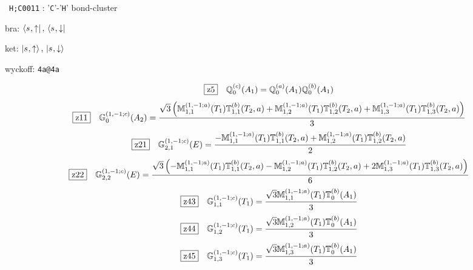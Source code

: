 \documentclass[fleqn,10pt,landscape]{jsarticle}
\begin{document}
\noindent\textbullet\, \texttt{H;C\texttt{}001\texttt{}1} : '\texttt{C}'-'\texttt{H}' bond-cluster

\noindent\quad * bra: $\bra{s_{},\uparrow},\, \bra{s_{},\downarrow}$

\noindent\quad * ket: $\ket{s_{},\uparrow},\, \ket{s_{},\downarrow}$

\noindent\quad * wyckoff: \texttt{4a@4a}

\begin{dmath*}
\hspace*{3mm}\fbox{z5}\quad \mathbb{Q}_{0}^{(c)}(A_{1})=\mathbb{Q}_{0}^{(a)}(A_{1}) \mathbb{Q}_{0}^{(b)}(A_{1})
\end{dmath*}
\begin{dmath*}
\hspace*{3mm}\fbox{z11}\quad \mathbb{G}_{0}^{(1,-1;c)}(A_{2})=\frac{\sqrt{3} \left(\mathbb{M}_{1,1}^{(1,-1;a)}(T_{1}) \mathbb{T}_{1,1}^{(b)}(T_{2},a) + \mathbb{M}_{1,2}^{(1,-1;a)}(T_{1}) \mathbb{T}_{1,2}^{(b)}(T_{2},a) + \mathbb{M}_{1,3}^{(1,-1;a)}(T_{1}) \mathbb{T}_{1,3}^{(b)}(T_{2},a)\right)}{3}
\end{dmath*}
\begin{dmath*}
\hspace*{3mm}\fbox{z21}\quad \mathbb{G}_{2,1}^{(1,-1;c)}(E)=\frac{- \mathbb{M}_{1,1}^{(1,-1;a)}(T_{1}) \mathbb{T}_{1,1}^{(b)}(T_{2},a) + \mathbb{M}_{1,2}^{(1,-1;a)}(T_{1}) \mathbb{T}_{1,2}^{(b)}(T_{2},a)}{2}
\end{dmath*}
\begin{dmath*}
\hspace*{3mm}\fbox{z22}\quad \mathbb{G}_{2,2}^{(1,-1;c)}(E)=\frac{\sqrt{3} \left(- \mathbb{M}_{1,1}^{(1,-1;a)}(T_{1}) \mathbb{T}_{1,1}^{(b)}(T_{2},a) - \mathbb{M}_{1,2}^{(1,-1;a)}(T_{1}) \mathbb{T}_{1,2}^{(b)}(T_{2},a) + 2 \mathbb{M}_{1,3}^{(1,-1;a)}(T_{1}) \mathbb{T}_{1,3}^{(b)}(T_{2},a)\right)}{6}
\end{dmath*}
\begin{dmath*}
\hspace*{3mm}\fbox{z43}\quad \mathbb{G}_{1,1}^{(1,-1;c)}(T_{1})=\frac{\sqrt{3} \mathbb{M}_{1,1}^{(1,-1;a)}(T_{1}) \mathbb{T}_{0}^{(b)}(A_{1})}{3}
\end{dmath*}
\begin{dmath*}
\hspace*{3mm}\fbox{z44}\quad \mathbb{G}_{1,2}^{(1,-1;c)}(T_{1})=\frac{\sqrt{3} \mathbb{M}_{1,2}^{(1,-1;a)}(T_{1}) \mathbb{T}_{0}^{(b)}(A_{1})}{3}
\end{dmath*}
\begin{dmath*}
\hspace*{3mm}\fbox{z45}\quad \mathbb{G}_{1,3}^{(1,-1;c)}(T_{1})=\frac{\sqrt{3} \mathbb{M}_{1,3}^{(1,-1;a)}(T_{1}) \mathbb{T}_{0}^{(b)}(A_{1})}{3}
\end{dmath*}
\end{document}
